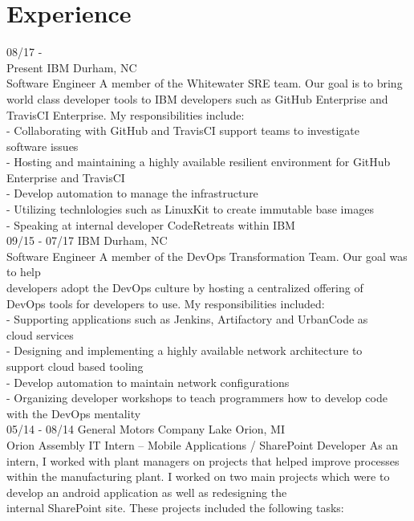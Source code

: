 \documentclass[]{friggeri-cv}
\begin{document}
\section{Experience}
\begin{entrylist}
  \entry
    {08/17 - \\Present}
    {IBM \hfill \hfill Durham, NC}
    {\\Software Engineer}
    {A member of the Whitewater SRE team. Our goal is to bring world class developer tools to IBM developers such as GitHub Enterprise and TravisCI Enterprise. My responsibilities include:\\
    - Collaborating with GitHub and TravisCI support teams to investigate \\software issues\\
    - Hosting and maintaining a highly available resilient environment for GitHub Enterprise and TravisCI\\
    - Develop automation to manage the infrastructure\\
    - Utilizing technlologies such as LinuxKit to create immutable base images\\
    - Speaking at internal developer CodeRetreats within IBM\\}
  \entry
    {09/15 - 07/17}
    {IBM \hfill \hfill Durham, NC}
    {\\Software Engineer}
    {A member of the DevOps Transformation Team. Our goal was to help \\developers adopt the DevOps culture by hosting a centralized offering of \\DevOps tools for developers to use. My responsibilities included:\\
    - Supporting applications such as Jenkins, Artifactory and UrbanCode as \\cloud services\\
    - Designing and implementing a highly available network architecture to \\support cloud based tooling\\
    - Develop automation to maintain network configurations\\
    - Organizing developer workshops to teach programmers how to develop code with the DevOps mentality\\}
  \entry
    {05/14 - 08/14}
    {General Motors Company \hfill \hfill Lake Orion, MI}
    {\\Orion Assembly IT Intern – Mobile Applications / SharePoint Developer}
    {As an intern, I worked with plant managers on projects that helped improve processes within the manufacturing plant. I worked on two main projects which were to develop an android application as well as redesigning the \\internal SharePoint site. These projects included the following tasks:\\
}
\end{entrylist}
\end{document}
